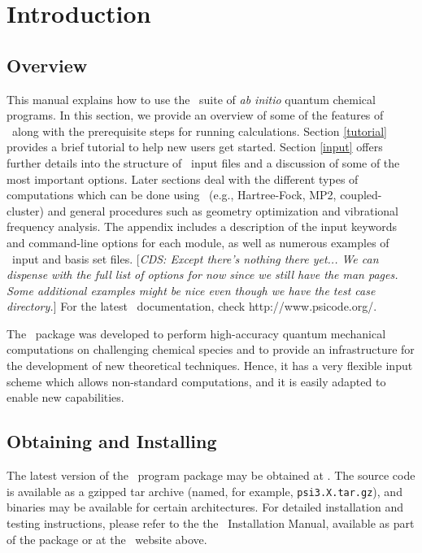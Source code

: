 \section{Introduction} \label{introduction}

\subsection{Overview}
This manual explains how to use the
\PSIthree\ suite of {\em ab initio} quantum chemical programs.  
In this section, we provide an overview of some
of the features of \PSIthree\ along with the prerequisite steps for
running calculations.  Section \ref{tutorial} provides a brief
tutorial to help new users get started.  Section \ref{input} offers
further details into the structure of \PSIthree\ input files
and a discussion of some of the most important options.
Later sections deal with the different types of computations which
can be done using \PSIthree\ (e.g., Hartree-Fock, MP2, coupled-cluster)
and general procedures such as geometry optimization
and vibrational frequency analysis.  
The appendix includes a description of
the input keywords and command-line options for each module, as well
as numerous examples of \PSIthree\ input and basis set files.
[{\em CDS: Except there's nothing there yet... We can dispense with the
full list of options for now since we still have the man pages.  Some
additional examples might be nice even though we have the test case 
directory.}]
For the latest \PSIthree\ documentation, check 
{http://www.psicode.org/}.

The \PSIthree\ package was developed to perform high-accuracy 
quantum mechanical computations on challenging chemical species
and to provide an infrastructure for the development of new
theoretical techniques.  Hence, it has a very flexible input
scheme which allows non-standard computations, and it is easily
adapted to enable new capabilities.

\subsection{Obtaining and Installing \PSIthree}
\label{installation}

The latest version of the \PSIthree\ program package may be obtained
at .
The source code is available as a gzipped tar archive (named, for
example, {\tt psi3.X.tar.gz}), and binaries may
be available for certain architectures.  For detailed installation and
testing instructions, please refer to the the \PSIthree\
Installation Manual, available as part of the package or at the
\PSIthree\ website above.


